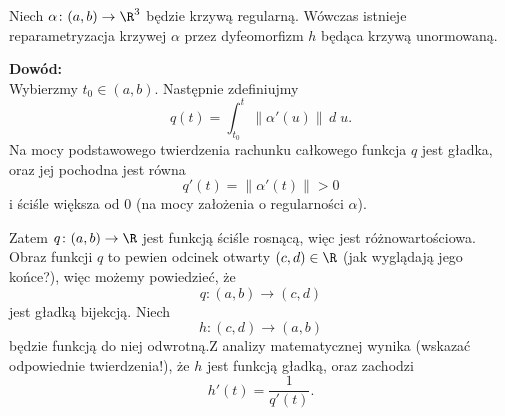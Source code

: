 \begin{frame}
\begin{twierdzenie}
Niech $\alpha\colon(a,b)\to \R^3$ będzie krzywą regularną. Wówczas istnieje reparametryzacja krzywej $\alpha$ przez dyfeomorfizm $h$ będąca krzywą unormowaną.
\end{twierdzenie}
\pause
\textcolor{ared}{\textbf{Dowód:}}\\
Wybierzmy $t_0\in (a,b)$. Następnie zdefiniujmy 
\[q(t)=\int_{t_0}^{t}\|\alpha'(u)\|\,d\;\!u.\]
\pause Na mocy podstawowego twierdzenia rachunku całkowego funkcja $q$ jest gładka, oraz jej pochodna jest równa 
\[q'(t)=\|\alpha'(t)\|>0\]
i ściśle większa od $0$ (na mocy założenia o regularności $\alpha$).
\end{frame}

\begin{frame}[<+->]
Zatem $q\colon (a,b)\to \R$ jest funkcją ściśle rosnącą, więc jest różnowartościowa. \pause
Obraz funkcji $q$ to pewien odcinek otwarty $(c,d)\in \R$ (jak wyglądają jego końce?), więc możemy powiedzieć, że 
\[q\colon (a,b)\to (c,d)\]
jest gładką bijekcją. \pause Niech 
\[h\colon (c,d)\to (a,b)\]będzie funkcją do niej odwrotną.\pause  Z analizy matematycznej wynika (wskazać odpowiednie twierdzenia!), że $h$ jest funkcją gładką, oraz zachodzi \[h'(t)=\frac{1}{q'(t)}.\]
\end{frame}

